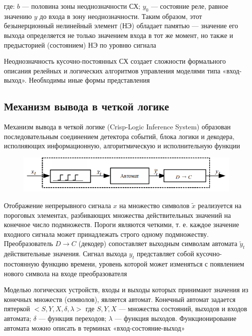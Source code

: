 где: $b$ — половина зоны неоднозначности СХ; $y_0$ — состояние реле, равное значению $y$ до входа в зону неоднозначности. Таким образом, этот безынерционный нелинейный элемент (НЭ) обладает памятью — значение его выхода определяется не только значением входа в тот же момент, но также и предысторией (состоянием) НЭ по уровню сигнала

Неоднозначность кусочно-постоянных СХ создает сложности формального описания релейных и логических алгоритмов управления моделями типа «вход-выход». Необходимы иные формы представления

\subsection{Механизм вывода в четкой логике}

Механизм вывода в четкой логике (Crisp-Logic Inference System) образован последовательным соединением детектора событий, блока логики и декодера, исполняющих информационную, алгоритмическую и исполнительную функции

\begin{figure}[H]
	\centering
	\includegraphics[width=0.7\linewidth]{body/images/logic-inference-system.png}
\end{figure}

Отображение непрерывного сигнала $x$ на множество символов $\widetilde{x}$ реализуется на пороговых элементах, разбивающих множества действительных значений на конечное число подмножеств. Пороги являются четкими, т. е. каждое значение входного сигнала может принадлежать строго одному подмножеству. Преобразователь $D \rightarrow C$ (декодер) сопоставляет выходным символам автомата  $\widetilde{y}_t$ действительные значения. Сигнал выхода $y_t$ представляет собой кусочно-постоянную функцию времени, уровень которой может изменяться с появлением нового символа на входе преобразователя

Моделью логических устройств, входы и выходы которых принимают значения из конечных множеств (символов), является автомат. Конечный автомат задается пятеркой   $<S, Y, X, \delta, \lambda>$ где $S, Y, X$ — множества состояний, выходов и входов автомата; $\delta$ — функция переходов; $\lambda$ — функция выходов. Функционирование автомата можно описать в терминах «вход-состояние-выход» 

